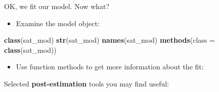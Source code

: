 \documentclass[]{book}
\newenvironment{Shaded}{\begin{snugshade}}{\end{snugshade}}
\newcommand{\KeywordTok}[1]{\textcolor[rgb]{0.13,0.29,0.53}{\textbf{#1}}}
\newcommand{\DataTypeTok}[1]{\textcolor[rgb]{0.13,0.29,0.53}{#1}}
\newcommand{\StringTok}[1]{\textcolor[rgb]{0.31,0.60,0.02}{#1}}
\newcommand{\OperatorTok}[1]{\textcolor[rgb]{0.81,0.36,0.00}{\textbf{#1}}}
\newcommand{\NormalTok}[1]{#1}
\providecommand{\tightlist}{%
  \setlength{\itemsep}{0pt}\setlength{\parskip}{0pt}}
\begin{document}
OK, we fit our model. Now what?

\begin{itemize}
\tightlist
\item
  Examine the model object:
\end{itemize}

\begin{Shaded}
\begin{Highlighting}[]
  \KeywordTok{class}\NormalTok{(sat_mod)}
  \KeywordTok{str}\NormalTok{(sat_mod)}
  \KeywordTok{names}\NormalTok{(sat_mod)}
  \KeywordTok{methods}\NormalTok{(}\DataTypeTok{class =} \KeywordTok{class}\NormalTok{(sat_mod))}
\end{Highlighting}
\end{Shaded}

\begin{itemize}
\tightlist
\item
  Use function methods to get more information about the fit:
\end{itemize}

\begin{Shaded}
\end{Shaded}

Selected \textbf{post-estimation} tools you may find useful:
\end{document}

